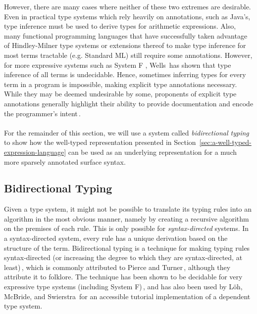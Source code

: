 However, there are many cases where neither of these two extremes are desirable. Even in practical type systems which rely heavily on annotations, such as Java's, type inference must be used to derive types for arithmetic expressions. Also, many functional programming languages that have successfully taken advantage of Hindley-Milner  type systems or extensions thereof to make type inference for most terms tractable (e.g. Standard ML) still require some annotations. However, for more expressive systems such as System F , Wells\,\cite{Wells96typability} has shown that type inference of all terms is undecidable. Hence, sometimes inferring types for every term in a program is impossible, making explicit type annotations necessary. While they may be deemed undesirable by some, proponents of explicit type annotations generally highlight their ability to provide documentation and encode the programmer's intent\,\cite{Dunfield:bidirectional}.
\paragraph{}
For the remainder of this section, we will use a system called \emph{bidirectional typing} to show how the well-typed representation presented in Section~\ref{sec:a-well-typed-expression-language} can be used as an underlying representation for a much more sparsely annotated surface syntax.

\subsection{Bidirectional Typing}
Given a type system, it might not be possible to translate its typing rules into an algorithm in the most obvious manner, namely by creating a recursive algorithm on the premises of each rule. This is only possible for \emph{syntax-directed} systems. In a syntax-directed system, every rule has a unique derivation based on the structure of the term. Bidirectional typing is a technique for making typing rules syntax-directed (or increasing the degree to which they are syntax-directed, at least)\,\cite{Christiansen:bidirectional}, which is commonly attributed to Pierce and Turner\,\cite{Pierce:2000}, although they attribute it to folklore. The technique has been shown to be decidable for very expressive type systems (including System F)\,\cite{Dunfield13:bidir}, and has also been used by L\"{o}h, McBride, and Swierstra\,\cite{Loh:2010} for an accessible tutorial implementation of a dependent type system.

